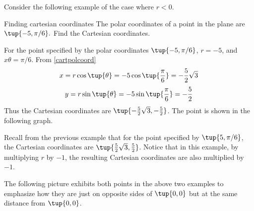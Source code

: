 Consider the following example of the case where $r < 0$. 

\begin{example}{Finding cartesian coordinates}{}
The polar coordinates of a point in the plane are $\tup{-5,\pi /6} .$
Find the Cartesian coordinates.
\end{example}

\begin{solution}
For the point specified by the polar coordinates $\tup{-5, \pi /6 }$,
$r=-5$, and $x\theta = \pi /6$. 
From \ref{cartpolcoord}
\[
x= r \cos \tup{\theta }= -5\cos \tup{\vspace{0.05in}\frac{\pi }{6}} = -\vspace{0.05in}\frac{5}{2}\sqrt{3}
\]
\[
y= r \sin \tup{\theta } = -5\sin \tup{\vspace{0.05in}\frac{\pi }{6}} = -\vspace{0.05in}\frac{5}{2}
\]
Thus the Cartesian coordinates are $\tup{-\vspace{0.05in}\frac{5}{2}\sqrt{3}, -\vspace{0.05in}\frac{5}{2}}$. The point is shown in the following graph.

\begin{center}
\end{center}

Recall from the previous example that for the point specified by $\tup{5, \pi /6 }$, the Cartesian coordinates are $\tup{\vspace{0.05in}\frac{5}{2}\sqrt{3}, \vspace{0.05in}\frac{5}{2}}$. Notice that in this example, by multiplying $r$ by $-1$, the resulting Cartesian coordinates are also multiplied by $-1$. 
\end{solution}

The following picture exhibits both points in the above two examples to
emphasize how they are just on opposite sides of $\tup{0,0} $ but at
the same distance from $\tup{0,0} $.

\begin{center}
\end{center}

